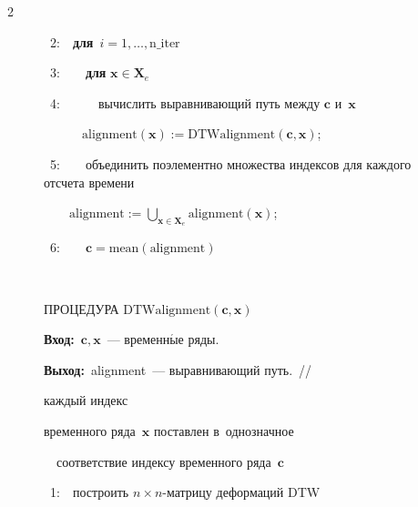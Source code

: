 \begin{multicols}{2}
\begin{figure}[b]
\ 2:\ \ \textbf{для}\ $i = 1, \dots, \text{n\_iter}$





\ 3:\ \ \ \ \textbf{для} $\mathbf{x} \in \mathbf{X}_e$





\ 4:\ \ \ \ \ \ вычислить выравнивающий путь между $\mathbf{c}$ и~$\mathbf{x}$\newline


\hphantom{\ 4:}\ \ \ \ \ \ $\mathrm{alignment}(\mathbf{x}) := \mathrm{DTWalignment}(\mathbf{c}, \mathbf{x})$;





\ 5:\ \ \ \ объединить поэлементно множества индексов для каждого отсчета времени\newline


\hphantom{\ 4:}\ \ \ \ $\mathrm{alignment} := \bigcup_{\mathbf{x} \in \mathbf{X}_e} \text{alignment}(\mathbf{x})$;





\ 6:\ \ \ \ $\mathbf{c} = \text{mean}(\text{alignment})$





\








ПРОЦЕДУРА $\mathrm{DTWalignment}(\mathbf{c}, \mathbf{x})$





\noindent


\textbf{Вход:}\ $\mathbf{c}, \mathbf{x}$~--- временн$\acute{\mbox{ы}}$е ряды.





\noindent


\textbf{Выход:}\ alignment~--- выравнивающий путь.~// {каждый индекс 


временного ряда~$\mathbf{x}$ поставлен в~однозначное\newline


\hphantom{\ 1:}\ \ соответствие индексу временного ряда~$\mathbf{c}$}





\ 1:\ \  {построить $n \times n$-матрицу деформаций DTW}\newline



\end{figure}
\end{multicols}

